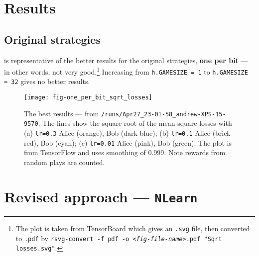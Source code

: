 \documentclass[12pt]{article}
\begin{document}
\section{Results}

\subsection{Original strategies}

 is representative of the better results for the original strategies, {\bf one per bit} --- in other words, not very good.\footnote{The plot is taken from TensorBoard which gives an \texttt{.svg} file, then converted to \texttt{.pdf} by \texttt{rsvg-convert -f pdf -o <{\em fig-file-name}>.pdf "Sqrt losses.svg"}.}  Increasing from \verb|h.GAMESIZE = 1| to \verb|h.GAMESIZE = 32| gives no better results.
\begin{figure}
	\centering
	\texttt{[image: fig-one\_per\_bit\_sqrt\_losses]}
	\caption{The best results --- from \texttt{/runs/Apr27\_23-01-58\_andrew-XPS-15-9570}. The lines show the square root of the mean square losses with (a) \texttt{lr=0.3} Alice (orange), Bob (dark blue); (b) \texttt{lr=0.1} Alice (brick red), Bob (cyan); (c) \texttt{lr=0.01} Alice (pink), Bob (green).  The plot is from TensorFlow and uses smoothing of 0.999. Note rewards from random plays are counted.}
	\label{fig:fig-oneperbitsqrtlosses}
\end{figure}

\section{Revised approach --- \texttt{NLearn}}
\end{document}
